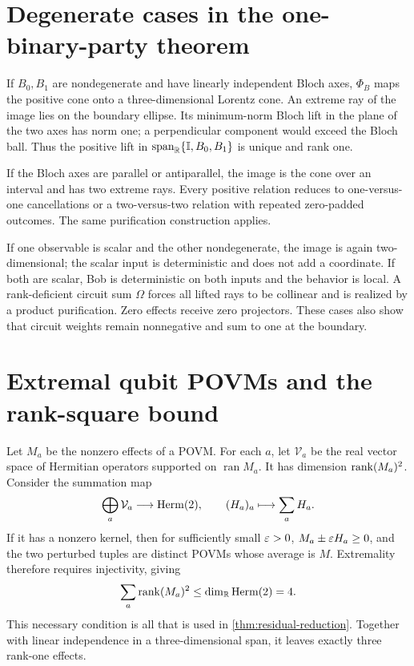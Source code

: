 \section{Degenerate cases in the one-binary-party theorem}
\label{app:binary-degeneracies}

If \(B_0,B_1\) are nondegenerate and have linearly independent Bloch axes,
\(\Phi_B\) maps the positive cone onto a three-dimensional Lorentz cone.
An extreme ray of the image lies on the boundary ellipse. Its minimum-norm
Bloch lift in the plane of the two axes has norm one; a perpendicular
component would exceed the Bloch ball. Thus the positive lift in
\(\operatorname{span}_{\mathbb R}\{\mathbb I,B_0,B_1\}\) is unique and rank one.

If the Bloch axes are parallel or antiparallel, the image is the cone over an
interval and has two extreme rays. Every positive relation reduces to
one-versus-one cancellations or a two-versus-two relation with repeated
zero-padded outcomes. The same purification construction applies.

If one observable is scalar and the other nondegenerate, the image is again
two-dimensional; the scalar input is deterministic and does not add a
coordinate. If both are scalar, Bob is deterministic on both inputs and the
behavior is local. A rank-deficient circuit sum \(\Omega\) forces all lifted
rays to be collinear and is realized by a product purification. Zero effects
receive zero projectors. These cases also show that circuit weights remain
nonnegative and sum to one at the boundary.

\section{Extremal qubit POVMs and the rank-square bound}
\label{app:extremal-povm}

Let \(M_a\) be the nonzero effects of a POVM. For each \(a\), let
\(\mathcal V_a\) be the real vector space of Hermitian operators supported on
\(\operatorname{ran}M_a\). It has dimension \(\operatorname{rank}(M_a)^2\).
Consider the summation map
\[
\bigoplus_a\mathcal V_a\longrightarrow\operatorname{Herm}(2),\qquad
(H_a)_a\longmapsto\sum_aH_a.
\]
If it has a nonzero kernel, then for sufficiently small \(\varepsilon>0\),
\(M_a\pm\varepsilon H_a\ge0\), and the two perturbed tuples are distinct POVMs whose
average is \(M\). Extremality therefore requires injectivity, giving
\[
\sum_a\operatorname{rank}(M_a)^2\le\dim_{\mathbb R}\operatorname{Herm}(2)=4.
\]
This necessary condition is all that is used in
\cref{thm:residual-reduction}. Together with linear independence in a
three-dimensional span, it leaves exactly three rank-one effects.

